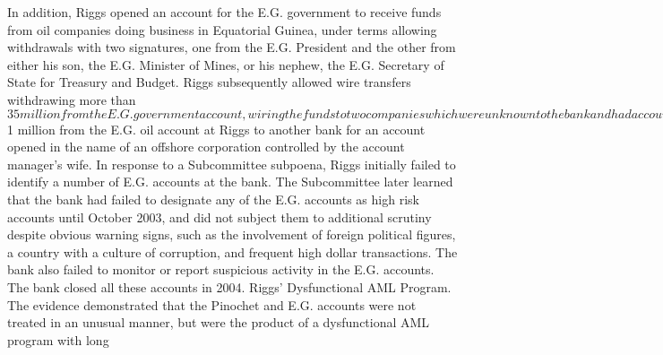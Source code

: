  
In addition, Riggs opened an account for the E.G. government to receive funds from oil companies
doing business in Equatorial Guinea, under terms allowing withdrawals with two signatures, one
from the E.G. President and the other from either his son, the E.G. Minister of Mines, or his nephew,
the E.G. Secretary of State for Treasury and Budget. Riggs subsequently allowed wire transfers
withdrawing more than $35 million from the E.G. government account, wiring the funds to two
companies which were unknown to the bank and had accounts in jurisdictions with bank secrecy
laws. The Subcommittee has reason to believe that at least one of these recipient companies is
controlled in whole or in part by the E.G. President. When, in 2004, the bank requested more
information about the two companies from the E.G. President, he declined to provide it, except to
say the wire transfers to them had been authorized.
The senior leadership at Riggs were well aware of the E.G. accounts and had met on several
occasions with the E.G. President and other E.G. officials. The bank leadership permitted the account
manager handling the E.G. relationship to become closely involved with E.G. officials and business
activities, including advising the E.G. government on financial matters and becoming the sole
signatory on an E.G. account holding substantial funds. The bank exercised such lax oversight of the
account manager’s activities that, among other misconduct, the account manager was able to wire
transfer more than $1 million from the E.G. oil account at Riggs to another bank for an account
opened in the name of an offshore corporation controlled by the account manager’s wife.
In response to a Subcommittee subpoena, Riggs initially failed to identify a number of E.G. accounts
at the bank. The Subcommittee later learned that the bank had failed to designate any of the E.G.
accounts as high risk accounts until October 2003, and did not subject them to additional scrutiny
despite obvious warning signs, such as the involvement of foreign political figures, a country with a
culture of corruption, and frequent high dollar transactions.
The bank also failed to monitor or report suspicious activity in the E.G. accounts.
The bank closed all these accounts in 2004.
Riggs’ Dysfunctional AML Program.
The evidence demonstrated that the Pinochet and E.G. accounts were not treated in an unusual
manner, but were the product of a dysfunctional AML program with long

